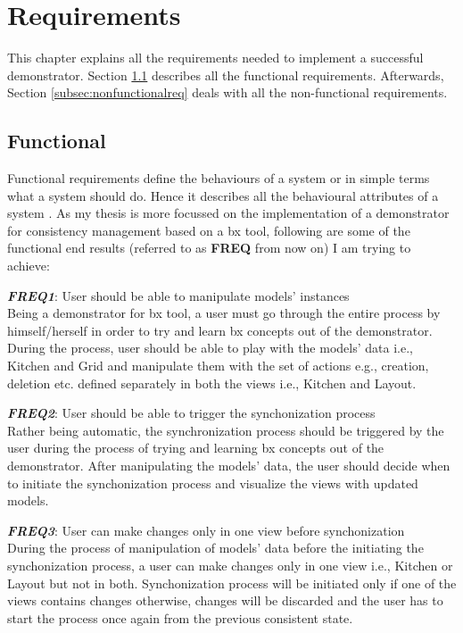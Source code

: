 \section{Requirements}\label{sec:requirements}
This chapter explains all the requirements needed to implement a successful demonstrator. Section \ref{subsec:functionalreq} describes all the functional requirements. Afterwards, Section \ref{subsec:nonfunctionalreq} deals with all the non-functional requirements. 

\subsection{Functional}\label{subsec:functionalreq}
Functional requirements define the behaviours of a system or in simple terms what a system should do. Hence it describes all the behavioural attributes of a system \cite{funcandnonfuncreq}.
\newline\newline As my thesis is more focussed on the implementation of a demonstrator for consistency management based on a bx tool, following are some of the functional end results (referred to as \textbf{FREQ} from now on) I am trying to achieve:

\textbf{\textit{FREQ1}}: User should be able to manipulate models' instances\\
Being a demonstrator for bx tool, a user must go through the entire process by himself/herself in order to try and learn bx concepts out of the demonstrator. During the process, user should be able to play with the models' data i.e., Kitchen and Grid and manipulate them with the set of actions e.g., creation, deletion etc. defined separately in both the views i.e., Kitchen and Layout.

\textbf{\textit{FREQ2}}: User should be able to trigger the synchonization process\\
Rather being automatic, the synchronization process should be triggered by the user during the process of trying and learning bx concepts out of the demonstrator. After manipulating the models' data, the user should decide when to initiate the synchonization process and visualize the views with updated models.

\textbf{\textit{FREQ3}}: User can make changes only in one view before synchonization\\
During the process of manipulation of models' data before the initiating the synchonization process, a user can make changes only in one view i.e., Kitchen or Layout but not in both. Synchonization process will be initiated only if one of the views contains changes otherwise, changes will be discarded and the user has to start the process once again from the previous consistent state.

